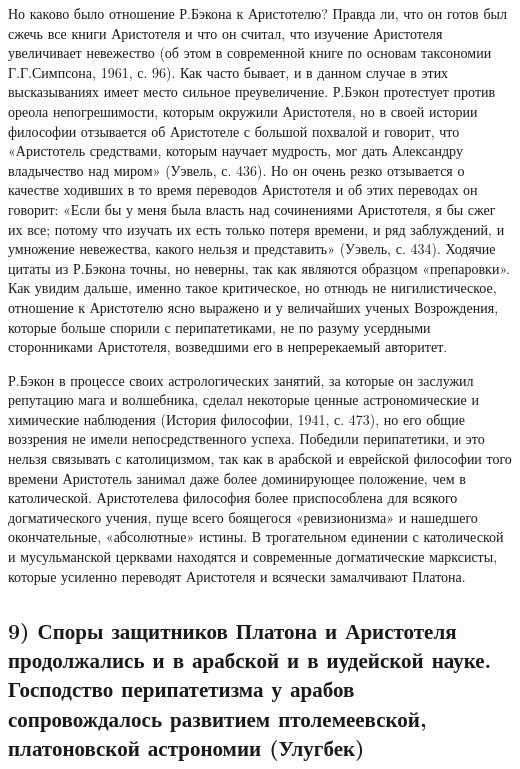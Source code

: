 Но  каково было  отношение Р.Бэкона  к Аристотелю?  Правда ли,  что он
готов был  сжечь все книги  Аристотеля и  что он считал,  что изучение
Аристотеля  увеличивает невежество  (об  этом в  современной книге  по
основам таксономии Г.Г.Симпсона,  1961, с. 96). Как часто  бывает, и в
данном случае в этих  высказываниях имеет место сильное преувеличение.
Р.Бэкон  протестует  против  ореола непогрешимости,  которым  окружили
Аристотеля, но  в своей истории  философии отзывается об  Аристотеле с
большой  похвалой  и  говорит,  что  «Аристотель  средствами,  которым
научает мудрость, мог дать  Александру владычество над миром» (Уэвель,
с.  436). Но  он  очень  резко отзывается  о  качестве  ходивших в  то
время  переводов Аристотеля  и  об этих  переводах  он говорит:  «Если
бы  у меня  была  власть  над сочинениями  Аристотеля,  я  бы сжег  их
все;  потому  что  изучать  их  есть  только  потеря  времени,  и  ряд
заблуждений,  и умножение  невежества,  какого  нельзя и  представить»
(Уэвель, с.  434). Ходячие цитаты  из Р.Бэкона точны, но  неверны, так
как являются  образцом «препаровки».  Как увидим дальше,  именно такое
критическое, но отнюдь не нигилистическое, отношение к Аристотелю ясно
выражено  и у  величайших ученых  Возрождения, которые  больше спорили
с  перипатетиками, не  по  разуму  усердными сторонниками  Аристотеля,
возведшими его в непререкаемый авторитет.

Р.Бэкон  в  процессе  своих  астрологических занятий,  за  которые  он
заслужил  репутацию   мага  и  волшебника,  сделал   некоторые  ценные
астрономические и  химические наблюдения (История философии,  1941, с.
473),  но  его  общие  воззрения не  имели  непосредственного  успеха.
Победили перипатетики, и это нельзя  связывать с католицизмом, так как
в  арабской  и еврейской  философии  того  времени Аристотель  занимал
даже более  доминирующее положение,  чем в  католической. Аристотелева
философия более приспособлена для  всякого догматического учения, пуще
всего боящегося «ревизионизма» и нашедшего окончательные, «абсолютные»
истины.  В  трогательном  единении   с  католической  и  мусульманской
церквами  находятся  и  современные догматические  марксисты,  которые
усиленно переводят Аристотеля и всячески замалчивают Платона.

\subsection{9)  Споры  защитников  Платона и  Аристотеля  продолжались
и  в  арабской  и  в   иудейской  науке.  Господство  перипатетизма  у
арабов сопровождалось развитием птолемеевской, платоновской астрономии
(Улугбек)}

